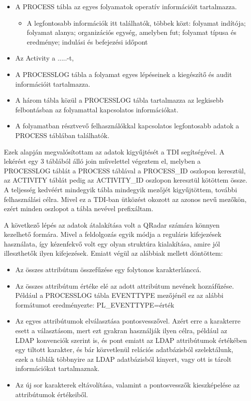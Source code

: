 \begin{itemize}
	\item A PROCESS tábla az egyes folyamatok operatív információit tartalmazza. 
	\begin{itemize}
		\item A legfontosabb információk itt találhatók, többek közt: folyamat indítója; folyamat alanya; organizációs egység, amelyben fut; folyamat típusa és eredménye; indulási és befejezési időpont
	\end{itemize}
	\item Az Activity a .....-t, 
	\item A PROCESSLOG tábla a folyamat egyes lépéseinek a kiegészítő és audit információit tartalmazza.
	\item A három tábla közül a PROCESSLOG tábla tartalmazza az legkisebb felbontásban az folyamattal kapcsolatos információkat.
	\item A folyamatban résztvevő felhasználókkal kapcsolatos legfontosabb adatok a PROCESS táblában találhatók.
\end{itemize}

Ezek alapján megvalósítottam az adatok kigyűjtését a TDI segítségével. A lekérést egy 3 táblából álló join művelettel végeztem el, melyben a PROCESSLOG táblát a PROCESS táblával a PROCESS\_ID oszlopon keresztül, az ACTIVITY táblát pedig az ACTIVITY\_ID oszlopon keresztül kötöttem össze. A teljesség kedvéért mindegyik tábla mindegyik mezőjét kigyűjtöttem, további felhasználási célra. Mivel ez a TDI-ban ütközést okozott az azonos nevű mezőkön, ezért minden oszlopot a tábla nevével prefixáltam.

A következő lépés az adatok átalakítása volt a QRadar számára könnyen kezelhető formára. Mivel a feldolgozás egyik módja a reguláris kifejezések használata, így kézenfekvő volt egy olyan struktúra kialakítása, amire jól illeszthetők ilyen kifejezések. Emiatt végül az alábbiak mellett döntöttem:

\begin{itemize}
	\item Az összes attribútum összefűzése egy folytonos karakterlánccá.
	\item Az összes attribútum értéke elé az adott attribútum nevének hozzáfűzése. Például a PROCESSLOG tábla EVENTTYPE mezőjénél ez az alábbi formátumot eredményezte: PL\_EVENTTYPE={érték}
	\item Az egyes attribútumok elválasztása pontosvesszővel. Azért erre a karakterre esett a választásom, mert ezt gyakran használják ilyen célra, például az LDAP konvenciók szerint is, és pont emiatt az LDAP attribútumok értékében egy tiltott karakter, és bár közvetlenül relációs adatbázisból szelektálunk, ezek a táblák többnyire az LDAP adatbázisból kinyert, vagy ott is tárolt információkat tartalmaznak.
	\item Az új sor karakterek eltávolítása, valamint a pontosvesszők \todo kieszképelése az attribútumok értékeiből.
\end{itemize} 

